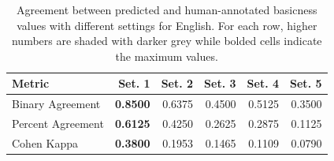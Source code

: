 \documentclass[preprint,12pt,authoryear]{elsarticle}
\begin{document}
\begin{table}[ht]
\centering
\caption{Agreement between predicted and human-annotated basicness values with different settings for English. For each row, higher numbers are shaded with darker grey while bolded cells indicate the maximum values.}
\label{tab:agreement_scores_comparison_en}
\begin{tabular}{@{}l r r r r r@{}}
\toprule
\textbf{Metric} & \textbf{Set. 1} & \textbf{Set. 2} & \textbf{Set. 3} & \textbf{Set. 4} & \textbf{Set. 5} \\ 
\midrule
Binary Agreement     & \cellcolor{gray!85} \textbf{0.8500} & \cellcolor{gray!55} 0.6375 & \cellcolor{gray!30} 0.4500 & \cellcolor{gray!38} 0.5125 & \cellcolor{gray!20} 0.3500 \\
Percent Agreement    & \cellcolor{gray!70} \textbf{0.6125} & \cellcolor{gray!45} 0.4250 & \cellcolor{gray!28} 0.2625 & \cellcolor{gray!32} 0.2875 & \cellcolor{gray!12} 0.1125 \\
Cohen Kappa          & \cellcolor{gray!43} \textbf{0.3800} & \cellcolor{gray!22} 0.1953 & \cellcolor{gray!17} 0.1465 & \cellcolor{gray!13} 0.1109 & \cellcolor{gray!8} 0.0790 \\
\bottomrule
\end{tabular}
\smallskip
\end{table}




\end{document}

